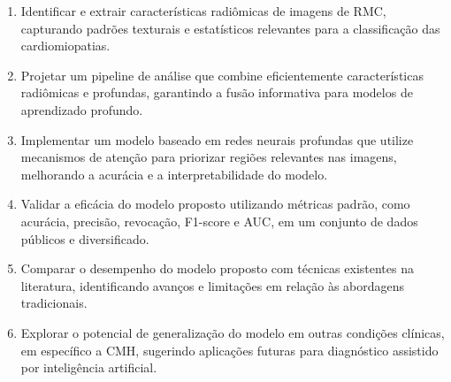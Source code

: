 \begin{enumerate}
\item Identificar e extrair características radiômicas de imagens de \gls{RMC}, capturando padrões texturais e estatísticos relevantes para a classificação das cardiomiopatias.

\item Projetar um pipeline de análise que combine eficientemente características radiômicas e profundas, garantindo a fusão informativa para modelos de aprendizado profundo.

\item Implementar um modelo baseado em redes neurais profundas que utilize mecanismos de atenção para priorizar regiões relevantes nas imagens, melhorando a acurácia e a interpretabilidade do modelo.

\item Validar a eficácia do modelo proposto utilizando métricas padrão, como acurácia, precisão, revocação, F1-score e AUC, em um conjunto de dados públicos e diversificado.

\item Comparar o desempenho do modelo proposto com técnicas existentes na literatura, identificando avanços e limitações em relação às abordagens tradicionais.

\item Explorar o potencial de generalização do modelo em outras condições clínicas, em específico a \gls{CMH}, sugerindo aplicações futuras para diagnóstico assistido por inteligência artificial.
\end{enumerate}






